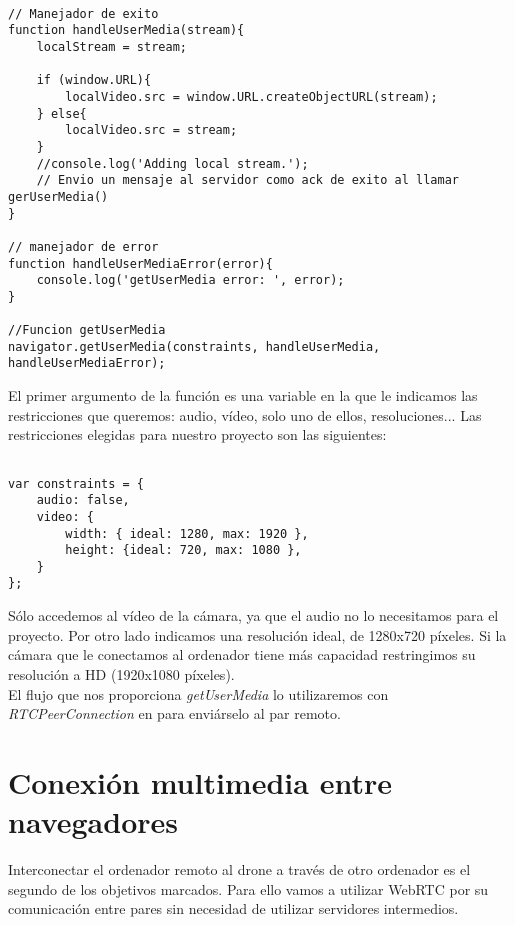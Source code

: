 \begin{lstlisting}[caption=getUserMedia.]

// Manejador de exito
function handleUserMedia(stream){
	localStream = stream;

	if (window.URL){
		localVideo.src = window.URL.createObjectURL(stream);
	} else{
		localVideo.src = stream;
	}
	//console.log('Adding local stream.');
	// Envio un mensaje al servidor como ack de exito al llamar gerUserMedia()	
}

// manejador de error
function handleUserMediaError(error){
	console.log('getUserMedia error: ', error);
}

//Funcion getUserMedia
navigator.getUserMedia(constraints, handleUserMedia, handleUserMediaError); 

\end{lstlisting}

El primer argumento de la función es una variable en la que le indicamos las restricciones que queremos: audio, vídeo, solo uno de ellos, resoluciones... Las restricciones elegidas para nuestro proyecto son las siguientes:\\

\begin{lstlisting}[caption=Restricciones de getUserMedia]

var constraints = {
    audio: false,
    video: {
        width: { ideal: 1280, max: 1920 },
        height: {ideal: 720, max: 1080 },
    }
};

\end{lstlisting}

Sólo accedemos al vídeo de la cámara, ya que el audio no lo necesitamos para el proyecto. Por otro lado indicamos una resolución ideal, de 1280x720 píxeles. Si la cámara que le conectamos al ordenador tiene más capacidad restringimos su resolución a HD (1920x1080 píxeles).\\

El flujo que nos proporciona \emph{getUserMedia} lo utilizaremos con \emph{RTCPeerConnection} en para enviárselo al par remoto.\\

\section{Conexión multimedia entre navegadores}

Interconectar el ordenador remoto al drone a través de otro ordenador es el segundo de los objetivos marcados. Para ello vamos a utilizar WebRTC por su comunicación entre pares sin necesidad de utilizar servidores intermedios.\\

